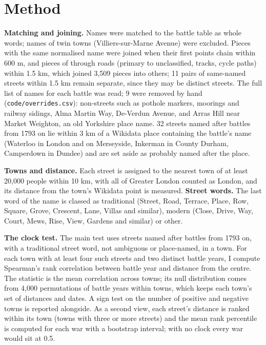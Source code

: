 \documentclass[11pt,a4paper]{article}
\begin{document}
\section{Method}
\textbf{Matching and joining.} Names were matched to the battle table as whole words; names of twin towns (Villiers-sur-Marne Avenue) were excluded. Pieces with the same normalised name were joined when their first points chain within 600 m, and pieces of through roads (primary to unclassified, tracks, cycle paths) within 1.5 km, which joined 3,509 pieces into others; 11 pairs of same-named streets within 1.5 km remain separate, since they may be distinct streets. The full list of names for each battle was read; 9 were removed by hand (\texttt{code/overrides.csv}): non-streets such as pothole markers, moorings and railway sidings, Alma Martin Way, De-Verdun Avenue, and Arras Hill near Market Weighton, an old Yorkshire place name. 32 streets named after battles from 1793 on lie within 3 km of a Wikidata place containing the battle's name (Waterloo in London and on Merseyside, Inkerman in County Durham, Camperdown in Dundee) and are set aside as probably named after the place.

\textbf{Towns and distance.} Each street is assigned to the nearest town of at least 20,000 people within 10 km, with all of Greater London counted as London, and its distance from the town's Wikidata point is measured. \textbf{Street words.} The last word of the name is classed as traditional (Street, Road, Terrace, Place, Row, Square, Grove, Crescent, Lane, Villas and similar), modern (Close, Drive, Way, Court, Mews, Rise, View, Gardens and similar) or other.

\textbf{The clock test.} The main test uses streets named after battles from 1793 on, with a traditional street word, not ambiguous or place-named, in a town. For each town with at least four such streets and two distinct battle years, I compute Spearman's rank correlation between battle year and distance from the centre. The statistic is the mean correlation across towns; its null distribution comes from 4,000 permutations of battle years within towns, which keeps each town's set of distances and dates. A sign test on the number of positive and negative towns is reported alongside. As a second view, each street's distance is ranked within its town (towns with three or more streets) and the mean rank percentile is computed for each war with a bootstrap interval; with no clock every war would sit at 0.5.
\end{document}
